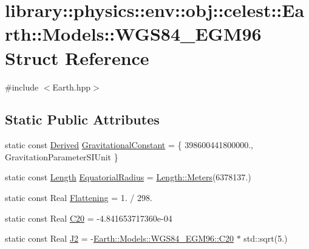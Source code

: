 \hypertarget{structlibrary_1_1physics_1_1env_1_1obj_1_1celest_1_1_earth_1_1_models_1_1_w_g_s84___e_g_m96}{}\section{library\+:\+:physics\+:\+:env\+:\+:obj\+:\+:celest\+:\+:Earth\+:\+:Models\+:\+:W\+G\+S84\+\_\+\+E\+G\+M96 Struct Reference}
\label{structlibrary_1_1physics_1_1env_1_1obj_1_1celest_1_1_earth_1_1_models_1_1_w_g_s84___e_g_m96}


{\ttfamily \#include $<$Earth.\+hpp$>$}

\subsection*{Static Public Attributes}
\begin{DoxyCompactItemize}
\item 
static const \hyperlink{classlibrary_1_1physics_1_1units_1_1_derived}{Derived} \hyperlink{structlibrary_1_1physics_1_1env_1_1obj_1_1celest_1_1_earth_1_1_models_1_1_w_g_s84___e_g_m96_ae98b4304d9fecdbd27877d61b327ac86}{Gravitational\+Constant} = \{ 398600441800000., Gravitation\+Parameter\+S\+I\+Unit \}
\item 
static const \hyperlink{classlibrary_1_1physics_1_1units_1_1_length}{Length} \hyperlink{structlibrary_1_1physics_1_1env_1_1obj_1_1celest_1_1_earth_1_1_models_1_1_w_g_s84___e_g_m96_a35680d133e5469bd3cb28e3027111058}{Equatorial\+Radius} = \hyperlink{classlibrary_1_1physics_1_1units_1_1_length_ad523a3737d5c3f23a64588eac83f2148}{Length\+::\+Meters}(6378137.)
\item 
static const Real \hyperlink{structlibrary_1_1physics_1_1env_1_1obj_1_1celest_1_1_earth_1_1_models_1_1_w_g_s84___e_g_m96_a40ac43be64c672a071714ee30b98e79e}{Flattening} = 1. / 298.
\item 
static const Real \hyperlink{structlibrary_1_1physics_1_1env_1_1obj_1_1celest_1_1_earth_1_1_models_1_1_w_g_s84___e_g_m96_afea460be3fb35c86345c600d09f71059}{C20} = -\/4.\+841653717360e-\/04
\item 
static const Real \hyperlink{structlibrary_1_1physics_1_1env_1_1obj_1_1celest_1_1_earth_1_1_models_1_1_w_g_s84___e_g_m96_afd5252f13403c428f68256ad7719fc8e}{J2} = -\/\hyperlink{structlibrary_1_1physics_1_1env_1_1obj_1_1celest_1_1_earth_1_1_models_1_1_w_g_s84___e_g_m96_afea460be3fb35c86345c600d09f71059}{Earth\+::\+Models\+::\+W\+G\+S84\+\_\+\+E\+G\+M96\+::\+C20} $\ast$ std\+::sqrt(5.)
\end{DoxyCompactItemize}


